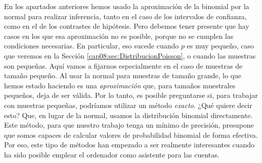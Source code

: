 En los apartados anteriores hemos usado la aproximación de la binomial por la normal para realizar
inferencia, tanto en el caso de los intervalos de confianza, como en el de los contrastes de
hipótesis. Pero debemos tener presente que hay casos en los que esa aproximación no es posible,
porque no se cumplen las condiciones necesarias. En particular, eso sucede cuando $p$ es muy
pequeño, caso que veremos en la Sección \ref{cap08:sec:DistribucionPoisson}, o cuando las muestras
son pequeñas.  Aquí vamos a fijarnos especialmente en el caso de muestras de tamaño pequeño.  Al
usar la normal para muestras de tamaño grande, lo que hemos estado haciendo es una {\em
aproximación} que, para tamaños muestrales pequeños, deja de ser válida. Por lo tanto, es posible preguntarse si, para trabajar con muestras pequeñas,
podríamos utilizar un método {\em exacto}. ¿Qué quiere decir esto? Que, en lugar de la normal,
usamos la distribución binomial directamente.  Este método, para que nuestro trabajo tenga un
mínimo de precisión, presupone que somos capaces de calcular valores de probabilidad binomial de
forma efectiva. Por eso, este tipo de métodos han empezado a ser realmente interesantes cuando ha
sido posible emplear el ordenador como asistente para las cuentas.

